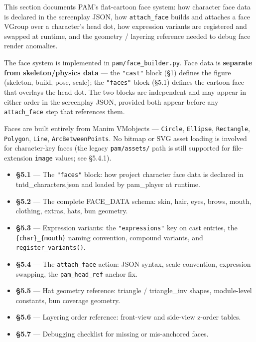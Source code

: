 \documentclass[
  11pt,
]{book}
\providecommand{\tightlist}{%
  \setlength{\itemsep}{0pt}\setlength{\parskip}{0pt}}
\begin{document}
This section documents PAM's flat-cartoon face system: how character
face data is declared in the screenplay JSON, how \texttt{attach\_face}
builds and attaches a face VGroup over a character's head dot, how
expression variants are registered and swapped at runtime, and the
geometry / layering reference needed to debug face render anomalies.

The face system is implemented in \texttt{pam/face\_builder.py}. Face
data is \textbf{separate from skeleton/physics data} --- the
\texttt{"cast"} block (§1) defines the figure (skeleton, build, pose,
scale); the \texttt{"faces"} block (§5.1) defines the cartoon face that
overlays the head dot. The two blocks are independent and may appear in
either order in the screenplay JSON, provided both appear before any
\texttt{attach\_face} step that references them.

Faces are built entirely from Manim VMobjects --- \texttt{Circle},
\texttt{Ellipse}, \texttt{Rectangle}, \texttt{Polygon}, \texttt{Line},
\texttt{ArcBetweenPoints}. No bitmap or SVG asset loading is involved
for character-key faces (the legacy \texttt{pam/assets/} path is still
supported for file-extension \texttt{image} values; see §5.4.1).

\begin{itemize}
\tightlist
\item
  \textbf{§5.1} --- The \texttt{"faces"} block: how project character
  face data is declared in tntd\_characters.json and loaded by
  pam\_player at runtime.
\item
  \textbf{§5.2} --- The complete FACE\_DATA schema: skin, hair, eyes,
  brows, mouth, clothing, extras, hats, bun geometry.
\item
  \textbf{§5.3} --- Expression variants: the \texttt{"expressions"} key
  on cast entries, the \texttt{\{char\}\_\{mouth\}} naming convention,
  compound variants, and \texttt{register\_variants()}.
\item
  \textbf{§5.4} --- The \texttt{attach\_face} action: JSON syntax, scale
  convention, expression swapping, the \texttt{pam\_head\_ref} anchor
  fix.
\item
  \textbf{§5.5} --- Hat geometry reference: triangle / triangle\_inv
  shapes, module-level constants, bun coverage geometry.
\item
  \textbf{§5.6} --- Layering order reference: front-view and side-view
  z-order tables.
\item
  \textbf{§5.7} --- Debugging checklist for missing or mis-anchored
  faces.
\end{itemize}
\end{document}
